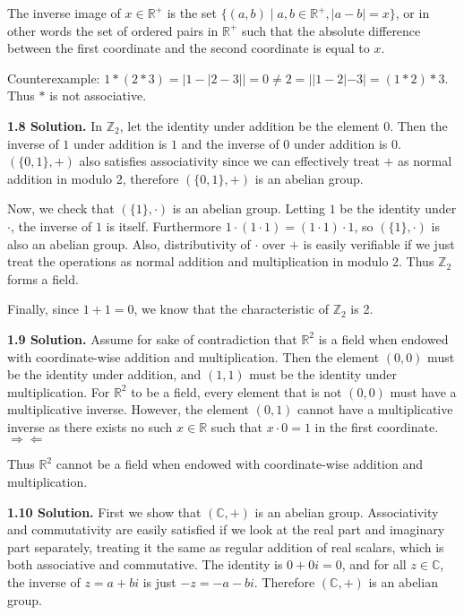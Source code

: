 The inverse image of $x\in\mathbb{R}^+$ is the set $\{(a,b)\mid a,b\in\mathbb{R}^+, |a-b|=x\}$, or in other words the set of ordered pairs in $\mathbb{R}^+$ such that the absolute difference between the first coordinate and the second coordinate is equal to $x$.

Counterexample: $1*(2*3)=|1-|2-3||=0\neq 2=||1-2|-3|=(1*2)*3$. Thus $*$ is not associative.

\textbf{1.8 Solution.} In $\mathbb{Z}_2$, let the identity under addition be the element $0$. Then the inverse of $1$ under addition is $1$ and the inverse of $0$ under addition is $0$. $(\{0,1\},+)$ also satisfies associativity since we can effectively treat $+$ as normal addition in modulo 2, therefore $(\{0,1\},+)$ is an abelian group.

Now, we check that $(\{1\},\cdot)$ is an abelian group. Letting $1$ be the identity under $\cdot$, the inverse of $1$ is itself. Furthermore $1\cdot(1\cdot1)=(1\cdot1)\cdot1$, so $(\{1\},\cdot)$ is also an abelian group. Also, distributivity of $\cdot$ over $+$ is easily verifiable if we just treat the operations as normal addition and multiplication in modulo 2. Thus $\mathbb{Z}_2$ forms a field.

Finally, since $1+1=0$, we know that the characteristic of $\mathbb{Z}_2$ is 2.

\textbf{1.9 Solution.} Assume for sake of contradiction that $\mathbb{R}^2$ is a field when endowed with coordinate-wise addition and multiplication. Then the element $(0,0)$ must be the identity under addition, and $(1,1)$ must be the identity under multiplication. For $\mathbb{R}^2$ to be a field, every element that is not $(0,0)$ must have a multiplicative inverse. However, the element $(0,1)$ cannot have a multiplicative inverse as there exists no such $x\in\mathbb{R}$ such that $x\cdot 0 = 1$ in the first coordinate. $\Rightarrow\Leftarrow$

Thus $\mathbb{R}^2$ cannot be a field when endowed with coordinate-wise addition and multiplication.

\textbf{1.10 Solution.} First we show that $(\mathbb{C},+)$ is an abelian group. Associativity and commutativity are easily satisfied if we look at the real part and imaginary part separately, treating it the same as regular addition of real scalars, which is both associative and commutative. The identity is $0+0i=0$, and for all $z\in\mathbb{C}$, the inverse of $z=a+bi$ is just $-z=-a-bi$. Therefore $(\mathbb{C},+)$ is an abelian group.

